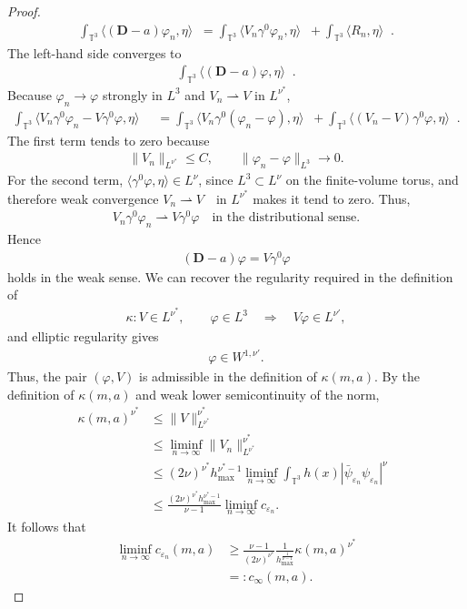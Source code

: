 \documentclass[10pt,a4paper]{amsart}
\newcommand{\T}{\mathbb{T}}
\newcommand{\dd}{\mathop{}\!\mathrm{d}}
\DeclareMathOperator{\dv}{\dd{vol}}
\newcommand{\eps}{\varepsilon}
\newcommand{\pD}{\mathbf{D}}
\begin{document}
\begin{proof}
\begin{align}
\int_{\T^3}
\langle(\pD-a)\varphi_n,\eta\rangle\dv=
\int_{\T^3}
\langle V_n\gamma^0\varphi_n,\eta\rangle\dv
+
\int_{\T^3}\langle R_n,\eta\rangle\dv.
\end{align}
The left-hand side converges to
\begin{align}
\int_{\T^3}\langle(\pD-a)\varphi,\eta\rangle\dv.
\end{align}
Because $\varphi_n\to\varphi$ strongly in $L^3$ and $V_n\rightharpoonup V$ in $L^{\nu^*}$,
\begin{align}
\int_{\T^3}
\langle V_n\gamma^0\varphi_n-V\gamma^0\varphi,\eta\rangle\dv&=\int_{\T^3}
\langle V_n\gamma^0(\varphi_n-\varphi),\eta\rangle\dv+\int_{\T^3}
\langle (V_n-V)\gamma^0\varphi,\eta\rangle\dv.
\end{align}
The first term tends to zero because
\begin{align}
\|V_n\|_{L^{\nu^*}}\le C,\qquad
\|\varphi_n-\varphi\|_{L^3}\to0.
\end{align}
For the second term,
$\langle\gamma^0\varphi,\eta\rangle\in L^\nu$,
since $L^3\subset L^\nu$ on the finite-volume torus, and therefore weak convergence
$V_n\rightharpoonup V\quad\text{in }L^{\nu^*}$
makes it tend to zero. Thus,
\begin{align}
V_n\gamma^0\varphi_n
\rightharpoonup
V\gamma^0\varphi\quad \text{in the distributional sense}.
\end{align}
Hence
\begin{align}
(\pD-a)\varphi=V\gamma^0\varphi
\end{align}
holds in the weak sense. We can recover the regularity required in the definition of
\begin{align}
\kappa:
V\in L^{\nu^*},\qquad \varphi\in L^3
\quad\Longrightarrow\quad
V\varphi\in L^{\nu'},
\end{align}
and elliptic regularity gives
\begin{align}
\varphi\in W^{1,\nu'}.
\end{align}
Thus, the pair $(\varphi,V)$ is admissible in the definition of $\kappa(m,a)$. By the definition of $\kappa(m,a)$ and weak lower semicontinuity of the norm,
\begin{align}
\kappa(m,a)^{\nu^*}
&\leq
\|V\|_{L^{\nu^*}}^{\nu^*}\\
&\leq
\liminf_{n\to\infty}
\|V_n\|_{L^{\nu^*}}^{\nu^*}\\
&\leq
(2\nu)^{\nu^*}
h_{\max}^{\nu^*-1}
\liminf_{n\to\infty}
\int_{\T^3}
h(x)|\bar\psi_{\eps_n}\psi_{\eps_n}|^\nu\dv\\
&\leq \frac{(2\nu)^{\nu^*}
h_{\max}^{\nu^*-1}}{\nu-1}\liminf_{n\to\infty}c_{\eps_n}.
\end{align}
It follows that
\begin{align}
\liminf_{n\to\infty}c_{\eps_n}(m,a)
&\geq
\frac{\nu-1}{(2\nu)^{\nu^*}}
\frac{1}{h_{\max}^{\frac{1}{\nu-1}}}
\kappa(m,a)^{\nu^*}\\
&=:c_\infty(m,a).
\end{align}




\end{proof}
\end{document}
